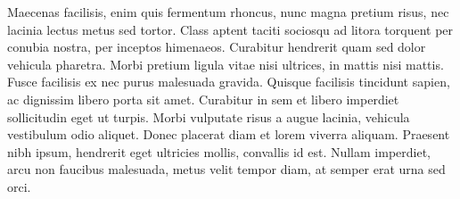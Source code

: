 \begin{abstracts}
Maecenas facilisis, enim quis fermentum rhoncus, nunc magna pretium risus, nec lacinia lectus metus
sed tortor. Class aptent taciti sociosqu ad litora torquent per conubia nostra, per inceptos
himenaeos. Curabitur hendrerit quam sed dolor vehicula pharetra. Morbi pretium ligula vitae nisi
ultrices, in mattis nisi mattis. Fusce facilisis ex nec purus malesuada gravida. Quisque facilisis
tincidunt sapien, ac dignissim libero porta sit amet. Curabitur in sem et libero imperdiet
sollicitudin eget ut turpis. Morbi vulputate risus a augue lacinia, vehicula vestibulum odio
aliquet. Donec placerat diam et lorem viverra aliquam. Praesent nibh ipsum, hendrerit eget ultricies
mollis, convallis id est. Nullam imperdiet, arcu non faucibus malesuada, metus velit tempor diam, at
semper erat urna sed orci.

\end{abstracts}
